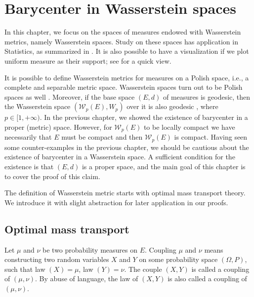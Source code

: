 \chapter{Barycenter in Wasserstein spaces}

In this chapter,
we focus on the spaces of measures endowed with Wasserstein metrics, namely Wasserstein spaces.
Study on these spaces has application in Statistics,
as summarized in \cite{le2017existence}.
It is also possible to have a visualization if we plot uniform measure as their support;
see  for a quick view.

It is possible to define Wasserstein metrics
\cite[Definition 6.1]{villani2008optimal}
for measures on a Polish space,
i.e., a complete and separable metric space.
Wasserstein spaces turn out to be Polish spaces as well \cite[Theorem 6.18]{villani2008optimal}.
Moreover, if the base space $(E,d)$ of measures is geodesic,
then the Wasserstein space $(\mathcal{W}_p(E), W_p)$ over it is also
geodesic \cite[Corollary 7.22]{villani2008optimal}, where $p \in [1, + \infty)$.
In the previous chapter, we showed the existence of barycenter in a proper (metric) space.
However, for $\mathcal{W}_p(E)$ to be locally compact we have necessarily that $E$ must be compact
\cite[Remark 7.19]{ambrosio2005gradient} and then $\mathcal{W}_p(E)$ is compact.
Having seen some counter-examples in the previous chapter,
we should be cautious about the existence of barycenter in a Wasserstein space.
A sufficient condition for the existence is that $(E,d)$ is a proper space,
and the main goal of this chapter is to cover the proof of this claim.

The definition of Wasserstein metric starts with optimal mass transport theory.
We introduce it with slight abstraction for later application in our proofs.

\section{Optimal mass transport}

\begin{defn}[Coupling]
	Let \(  \mu \) and \(  \nu  \) be two probability measures on $E$.
	Coupling \( \mu \) and \( \nu \) means constructing two random variables \( X \) and \( Y \) on some probability space \( ( \Omega , P )\),
	such that law \( ( X ) = \mu \), law \( ( Y ) = \nu .
	\) The couple \( ( X , Y ) \) is called a coupling of \( ( \mu , \nu ) .
	\) By abuse of language,
	the law of \( ( X , Y ) \) is also called a coupling of \( ( \mu , \nu ) \).
\end{defn}

